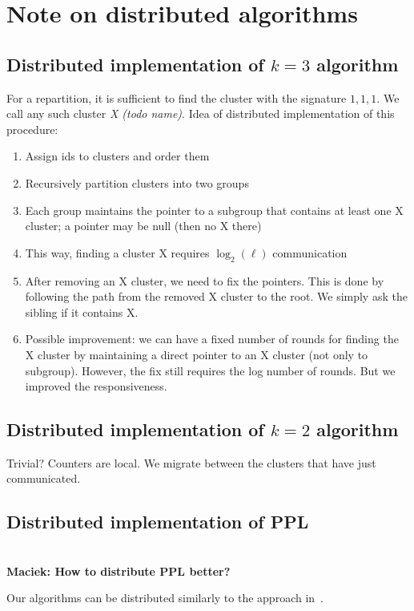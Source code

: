 \documentclass[manuscript,screen=true, review, anonymous]{acmart}
\newcommand\maciek[1]{\color{brown}\textbf{\\ Maciek: #1}\color{black}}
\begin{document}
\section{Note on distributed algorithms}


\subsection{Distributed implementation of $k=3$ algorithm}

For a repartition, it is sufficient to find the cluster with the signature $1,1,1$. 
We call any such cluster \emph{X (todo name)}.
Idea of distributed implementation of this procedure:
\begin{enumerate}
	\item Assign ids to clusters and order them
	\item Recursively partition clusters into two groups
	\item Each group maintains the pointer to a subgroup that contains at least one X cluster; a pointer may be null (then no X there)
	\item This way, finding a cluster X requires $\log_2(\ell)$ communication
	\item After removing an X cluster, we need to fix the pointers. This is done by following the path from the removed X cluster to the root. We simply ask the sibling if it contains X.
	\item Possible improvement: we can have a fixed number of rounds for finding the X cluster by maintaining a direct pointer to an X cluster (not only to subgroup). However, the fix still requires the log number of rounds. But we improved the responsiveness.
\end{enumerate}

\subsection{Distributed implementation of $k=2$ algorithm}

Trivial? Counters are local. We migrate between the clusters that have just communicated.

\subsection{Distributed implementation of PPL}

\maciek{How to distribute PPL better?}

Our algorithms can be distributed
similarly to the approach in~\cite{sigmetrics19_partitioning}.
\end{document}
